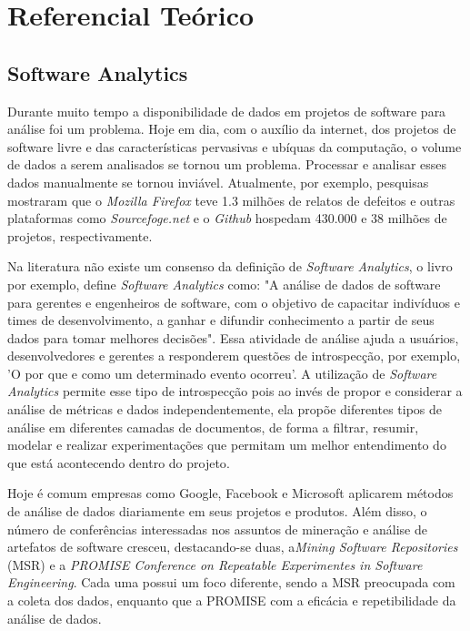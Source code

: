 \chapter{Referencial Teórico}
\label{ref}
\section{Software Analytics}
\label{ref:sof}
Durante muito tempo a disponibilidade de dados em projetos de software para análise foi um problema. Hoje em dia, com o auxílio da internet, dos projetos de software livre e das características pervasivas e ubíquas da computação, o volume de dados a serem analisados se tornou um problema. Processar e analisar esses dados manualmente se tornou inviável\cite{artAndScience}. Atualmente, por exemplo, pesquisas mostraram que o \textit{Mozilla Firefox} teve 1.3 milhões de relatos de defeitos e outras plataformas como \textit{Sourcefoge.net} e o \textit{Github} hospedam 430.000 e 38 milhões de projetos, respectivamente\cite{informationNeeds}.

Na literatura não existe um consenso da definição de \textit{Software Analytics}, o livro~\cite{artAndScience} por exemplo,  define \textit{Software Analytics} como: "A análise de dados de software para gerentes e engenheiros de software, com o objetivo de capacitar indivíduos e times de desenvolvimento, a ganhar e difundir conhecimento a partir de seus dados para tomar melhores decisões". Essa atividade de análise ajuda a usuários, desenvolvedores e gerentes a responderem questões de introspecção, por exemplo, 'O por que e como um determinado evento ocorreu'. A utilização de \textit{Software Analytics} permite esse tipo de introspecção pois ao invés de propor e considerar a análise de métricas e dados independentemente, ela propõe diferentes tipos de análise em diferentes camadas de documentos, de forma a filtrar, resumir, modelar e realizar experimentações que permitam um melhor entendimento do que está acontecendo dentro do projeto\cite{informationNeeds}.

Hoje é comum empresas como Google, Facebook e Microsoft aplicarem métodos de análise de dados diariamente em seus projetos e produtos. Além disso, o número de conferências interessadas nos assuntos de mineração e análise de artefatos de software cresceu, destacando-se duas, a\textit{Mining Software Repositories} (MSR) e a \textit{PROMISE Conference on Repeatable Experimentes in Software Engineering}. Cada uma possui um foco diferente, sendo a MSR preocupada com a coleta dos dados, enquanto que a PROMISE com a eficácia e repetibilidade da análise de dados.

